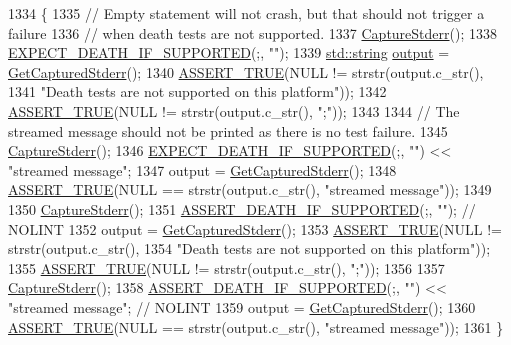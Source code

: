 \begin{DoxyCode}
1334                                                                   \{
1335   \textcolor{comment}{// Empty statement will not crash, but that should not trigger a failure}
1336   \textcolor{comment}{// when death tests are not supported.}
1337   \hyperlink{namespacetesting_1_1internal_a8ec00d458d0d442bd64af7b5f9c22dda}{CaptureStderr}();
1338   \hyperlink{gtest-death-test_8h_a8564de0e012dd0898949c513d1571f8b}{EXPECT\_DEATH\_IF\_SUPPORTED}(;, \textcolor{stringliteral}{""});
1339   \hyperlink{namespacetesting_1_1internal_a8e8ff5b11e64078831112677156cb111}{std::string} \hyperlink{namespacegmock__output__test_a4277f8598ba3835393fe82e82d09375d}{output} = \hyperlink{namespacetesting_1_1internal_a374156401da17704099d0c33fa53adfb}{GetCapturedStderr}();
1340   \hyperlink{gtest_8h_ae9244bfbda562e8b798789b001993fa5}{ASSERT\_TRUE}(NULL != strstr(output.c\_str(),
1341                              \textcolor{stringliteral}{"Death tests are not supported on this platform"}));
1342   \hyperlink{gtest_8h_ae9244bfbda562e8b798789b001993fa5}{ASSERT\_TRUE}(NULL != strstr(output.c\_str(), \textcolor{stringliteral}{";"}));
1343 
1344   \textcolor{comment}{// The streamed message should not be printed as there is no test failure.}
1345   \hyperlink{namespacetesting_1_1internal_a8ec00d458d0d442bd64af7b5f9c22dda}{CaptureStderr}();
1346   \hyperlink{gtest-death-test_8h_a8564de0e012dd0898949c513d1571f8b}{EXPECT\_DEATH\_IF\_SUPPORTED}(;, \textcolor{stringliteral}{""}) << \textcolor{stringliteral}{"streamed message"};
1347   output = \hyperlink{namespacetesting_1_1internal_a374156401da17704099d0c33fa53adfb}{GetCapturedStderr}();
1348   \hyperlink{gtest_8h_ae9244bfbda562e8b798789b001993fa5}{ASSERT\_TRUE}(NULL == strstr(output.c\_str(), \textcolor{stringliteral}{"streamed message"}));
1349 
1350   \hyperlink{namespacetesting_1_1internal_a8ec00d458d0d442bd64af7b5f9c22dda}{CaptureStderr}();
1351   \hyperlink{gtest-death-test_8h_ab2f0f25b46353767179a49ebd15b7345}{ASSERT\_DEATH\_IF\_SUPPORTED}(;, \textcolor{stringliteral}{""});  \textcolor{comment}{// NOLINT}
1352   output = \hyperlink{namespacetesting_1_1internal_a374156401da17704099d0c33fa53adfb}{GetCapturedStderr}();
1353   \hyperlink{gtest_8h_ae9244bfbda562e8b798789b001993fa5}{ASSERT\_TRUE}(NULL != strstr(output.c\_str(),
1354                              \textcolor{stringliteral}{"Death tests are not supported on this platform"}));
1355   \hyperlink{gtest_8h_ae9244bfbda562e8b798789b001993fa5}{ASSERT\_TRUE}(NULL != strstr(output.c\_str(), \textcolor{stringliteral}{";"}));
1356 
1357   \hyperlink{namespacetesting_1_1internal_a8ec00d458d0d442bd64af7b5f9c22dda}{CaptureStderr}();
1358   \hyperlink{gtest-death-test_8h_ab2f0f25b46353767179a49ebd15b7345}{ASSERT\_DEATH\_IF\_SUPPORTED}(;, \textcolor{stringliteral}{""}) << \textcolor{stringliteral}{"streamed message"};  \textcolor{comment}{// NOLINT}
1359   output = \hyperlink{namespacetesting_1_1internal_a374156401da17704099d0c33fa53adfb}{GetCapturedStderr}();
1360   \hyperlink{gtest_8h_ae9244bfbda562e8b798789b001993fa5}{ASSERT\_TRUE}(NULL == strstr(output.c\_str(), \textcolor{stringliteral}{"streamed message"}));
1361 \}
\end{DoxyCode}
